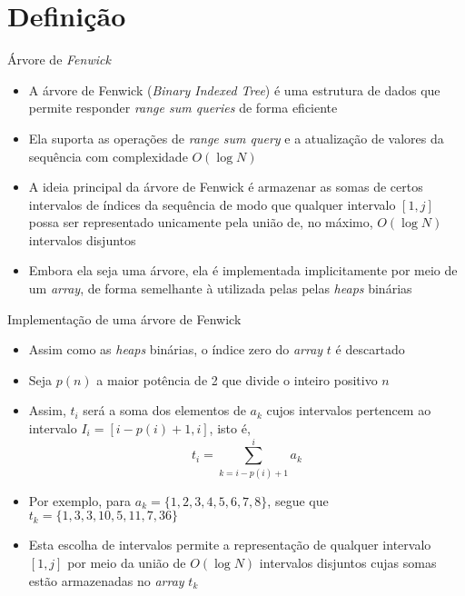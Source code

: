 \section{Definição}

\begin{frame}[fragile]{Árvore de \textit{Fenwick}} 

    \begin{itemize}
        \item A árvore de Fenwick (\textit{Binary Indexed Tree}) é uma estrutura de dados que
            permite responder \textit{range sum queries} de forma eficiente

        \item Ela suporta as operações de \textit{range sum query} e a atualização de valores da
            sequência com complexidade $O(\log N)$

        \item A ideia principal da árvore de Fenwick é armazenar as somas de certos intervalos
            de índices da sequência de modo que qualquer intervalo $[1, j]$
            possa ser representado unicamente pela união de, no máximo, $O(\log N)$ intervalos
            disjuntos

        \item Embora ela seja uma árvore, ela é implementada implicitamente por meio de um 
            \textit{array}, de forma semelhante à utilizada pelas pelas \textit{heaps} binárias
    \end{itemize}

\end{frame}

\begin{frame}[fragile]{Implementação de uma árvore de Fenwick}

    \begin{itemize}
        \item Assim como as \textit{heaps} binárias, o índice zero do  \textit{array}
            $t$ é descartado

        \item Seja $p(n)$ a maior potência de 2 que divide o inteiro positivo $n$

        \item Assim, $t_i$ será a soma dos elementos de $a_k$ cujos intervalos pertencem ao
            intervalo $I_i = [i - p(i) + 1, i]$, isto é,
        \[
            t_i = \sum_{k = i - p(i) + 1}^i a_k
        \]

        \item Por exemplo, para $a_k = \lbrace 1, 2, 3, 4, 5, 6, 7, 8\rbrace$, segue que
            $t_k = \lbrace 1, 3, 3, 10, 5, 11, 7, 36\rbrace$

        \item Esta escolha de intervalos permite a representação de qualquer intervalo $[1, j]$
            por meio da união de $O(\log N)$ intervalos disjuntos cujas somas estão armazenadas
            no \textit{array} $t_k$
    \end{itemize}

\end{frame}

